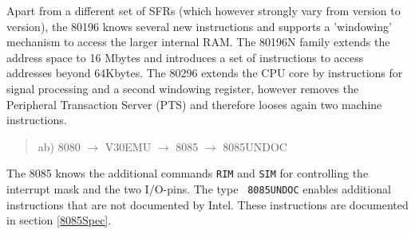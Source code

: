 \documentclass[12pt,twoside]{report}
\newcommand{\tty}[1]{{\tt #1}}
\begin{document}
Apart from a different set of SFRs (which however strongly vary from
version to version), the 80196 knows several new instructions and
supports a 'windowing' mechanism to access the larger internal RAM.
The 80196N family extends the address space to 16 Mbytes and
introduces a set of instructions to access addresses beyond 64Kbytes.
The 80296 extends the CPU core by instructions for signal processing
and a second windowing register, however removes the Peripheral
Transaction Server (PTS) and therefore looses again two machine
instructions.
\begin{quote}
ab) 8080 $\rightarrow$ V30EMU $\rightarrow$ 8085 $\rightarrow$ 8085UNDOC
\end{quote}
The 8085 knows the additional commands \tty{RIM} and \tty{SIM} for
controlling the interrupt mask and the two I/O-pins.  The type {\tt
8085UNDOC} enables additional instructions that are not documented
by Intel.  These instructions are documented in section \ref{8085Spec}.
\end{document}
